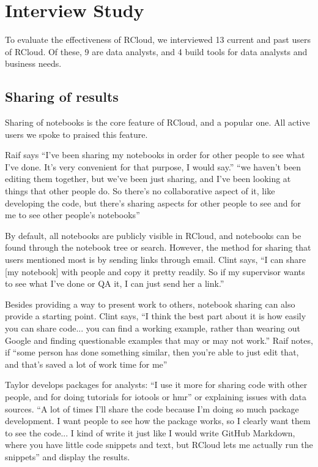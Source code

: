 \section{Interview Study\label{sec:interviews}}



To evaluate the effectiveness of RCloud, we interviewed 13 current and past
users of RCloud. Of these, 9 are data analysts, and 4 build tools for data
analysts and business needs.




\subsection{Sharing of results}
Sharing of notebooks is the core feature of RCloud, and a popular one. All
active users we spoke to praised this feature.


Raif says ``I've been sharing my notebooks in order for other people to see what
I've done. It's very convenient for that purpose, I would say.'' ``we haven't
been editing them together, but we've been just sharing, and I've been looking
at things that other people do. So there's no collaborative aspect of it, like
developing the code, but there's sharing aspects for other people to see and for
me to see other people's notebooks''

By default, all notebooks are publicly visible in RCloud, and notebooks can be
found through the notebook tree or search. However, the method for sharing that
users mentioned most is by sending links through email. Clint says, ``I can
share [my notebook] with people and copy it pretty readily. So if my supervisor
wants to see what I've done or QA it, I can just send her a link.''

Besides providing a way to present work to others, notebook sharing can also
provide a starting point. Clint says, ``I think the best part about it is how
easily you can share code... you can find a working example, rather than wearing
out Google and finding questionable examples that may or may not work.'' Raif
notes, if ``some person has done something similar, then you're able to just
edit that, and that's saved a lot of work time for me''

Taylor develops packages for analysts: ``I use it more for sharing code with
other people, and for doing tutorials for iotools or hmr'' or explaining issues
with data sources. ``A lot of times I'll share the code because I'm doing so
much package development. I want people to see how the package works, so I
clearly want them to see the code... I kind of write it just like I would write
GitHub Markdown, where you have little code snippets and text, but RCloud lets
me actually run the snippets'' and display the results.

